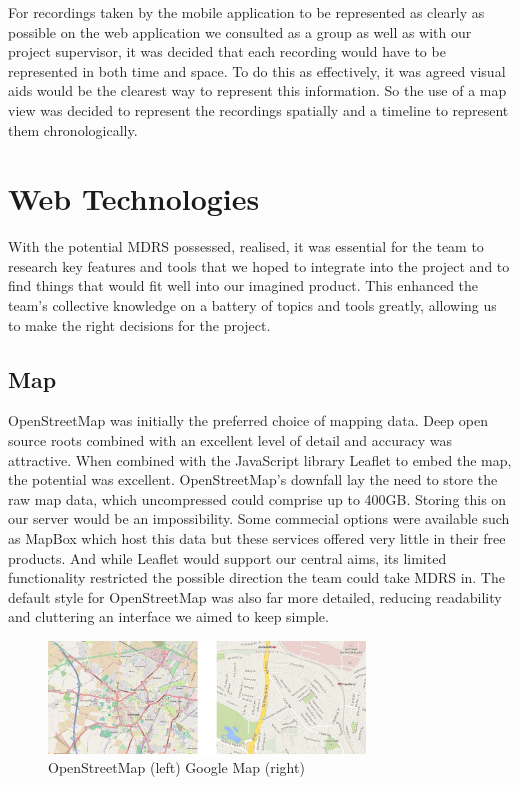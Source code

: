 \documentclass{l3proj}
\begin{document}
For recordings taken by the mobile application to be represented as clearly as possible on the web application we consulted as a group as well as with our project supervisor, it was decided that each recording would have to be represented in both time and space. To do this as effectively, it was agreed visual aids would be the clearest way to represent this information. So the use of a map view was decided to represent the recordings spatially and a timeline to represent them chronologically.

\section{Web Technologies}

With the potential MDRS possessed, realised, it was essential for the team to research key features and tools that we hoped to integrate into the project and to find things that would fit well into our imagined product. This enhanced the team's collective knowledge on a battery of topics and tools greatly, allowing us to make the right decisions for the project.

\subsection{Map}

OpenStreetMap\cite{openStreetMap} was initially the preferred choice of mapping data. Deep open source roots combined with an excellent level of detail and accuracy was attractive. When combined with the JavaScript library \gls{Leaflet} to embed the map, the potential was excellent. OpenStreetMap's downfall lay the need to store the raw map data, which uncompressed could comprise up to 400GB. Storing this on our server would be an impossibility. Some commecial options were available such as MapBox which host this data but these services offered very little in their free products. And while Leaflet would support our central aims, its limited functionality restricted the possible direction the team could take MDRS in. The default style for OpenStreetMap was also far more detailed, reducing readability and cluttering an interface we aimed to keep simple.

\begin{figure}[ht!]
  \centering
\includegraphics[width=0.75\textwidth]{images/openstreetmap_google-map.jpg}
\caption{OpenStreetMap (left) Google Map (right)}
\end{figure}
\end{document}
